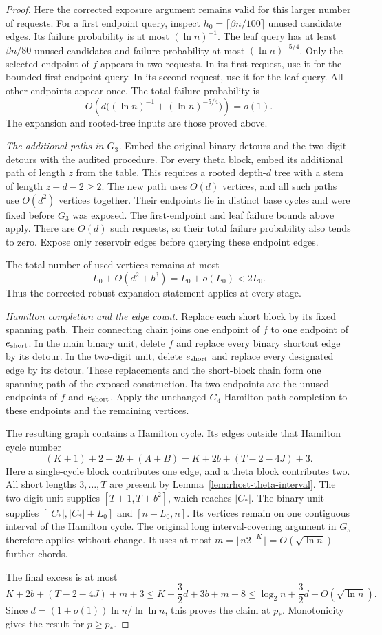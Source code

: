 \begin{proof}
Here the corrected exposure argument remains valid for this larger number of requests.
For a first endpoint query, inspect $h_0=\lceil\beta n/100\rceil$ unused candidate edges.
Its failure probability is at most $(\ln n)^{-1}$.
The leaf query has at least $\beta n/80$ unused candidates and failure probability at most $(\ln n)^{-5/4}$.
Only the selected endpoint of $f$ appears in two requests.
In its first request, use it for the bounded first-endpoint query.
In its second request, use it for the leaf query.
All other endpoints appear once.
The total failure probability is
\[
 O\!\left(d\bigl((\ln n)^{-1}+(\ln n)^{-5/4}\bigr)\right)=o(1).
\]
The expansion and rooted-tree inputs are those proved above.

\emph{The additional paths in $G_3$.}
Embed the original binary detours and the two-digit detours with the audited procedure.
For every theta block, embed its additional path of length $z$ from the table.
This requires a rooted depth-$d$ tree with a stem of length $z-d-2\ge2$.
The new path uses $O(d)$ vertices, and all such paths use $O(d^2)$ vertices together.
Their endpoints lie in distinct base cycles and were fixed before $G_3$ was exposed.
The first-endpoint and leaf failure bounds above apply.
There are $O(d)$ such requests, so their total failure probability also tends to zero.
Expose only reservoir edges before querying these endpoint edges.

The total number of used vertices remains at most
\[
 L_0+O(d^2+b^3)=L_0+o(L_0)<2L_0.
\]
Thus the corrected robust expansion statement applies at every stage.

\emph{Hamilton completion and the edge count.}
Replace each short block by its fixed spanning path.
Their connecting chain joins one endpoint of $f$ to one endpoint of $e_{\rm short}$.
In the main binary unit, delete $f$ and replace every binary shortcut edge by its detour.
In the two-digit unit, delete $e_{\rm short}$ and replace every designated edge by its detour.
These replacements and the short-block chain form one spanning path of the exposed construction.
Its two endpoints are the unused endpoints of $f$ and $e_{\rm short}$.
Apply the unchanged $G_4$ Hamilton-path completion to these endpoints and the remaining vertices.

The resulting graph contains a Hamilton cycle.
Its edges outside that Hamilton cycle number
\[
 (K+1)+2+2b+(A+B)
 =K+2b+(T-2-4J)+3.
\]
Here a single-cycle block contributes one edge, and a theta block contributes two.
All short lengths $3,\ldots,T$ are present by Lemma~\ref{lem:rhost-theta-interval}.
The two-digit unit supplies $[T+1,T+b^2]$, which reaches $|C_*|$.
The binary unit supplies $[|C_*|,|C_*|+L_0]$ and $[n-L_0,n]$.
Its vertices remain on one contiguous interval of the Hamilton cycle.
The original long interval-covering argument in $G_5$ therefore applies without change.
It uses at most $m=\lfloor n2^{-K}\rfloor=O(\sqrt{\ln n})$ further chords.

The final excess is at most
\[
 K+2b+(T-2-4J)+m+3
 \le K+\frac32d+3b+m+8
 \le\log_2n+\frac32d+O(\sqrt{\ln n}).
\]
Since $d=(1+o(1))\ln n/\ln\ln n$, this proves the claim at $p_*$.
Monotonicity gives the result for $p\ge p_*$.
\end{proof}

